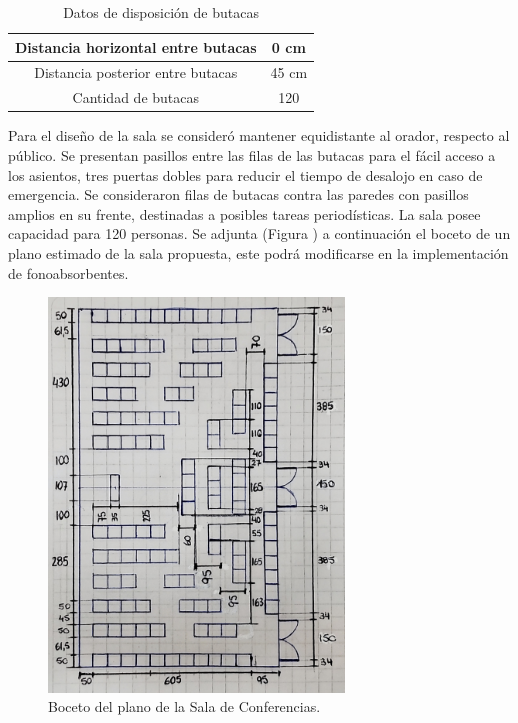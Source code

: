 \begin{table}[H]
\setlength\arrayrulewidth{1pt}
    \centering
    \begin{tabular}{|c|c|} \hline
        Distancia horizontal entre butacas & 0 cm  \\ \hline
        Distancia posterior entre butacas  & 45 cm  \\ \hline
        Cantidad de butacas & 120 \\ \hline
    \end{tabular}
    \caption{Datos de disposición de butacas}
    \label{tab:my_label}
\end{table}

\par Para el diseño de la sala se consideró mantener equidistante al orador, respecto al público. Se presentan pasillos entre las filas de las butacas para el fácil acceso a los asientos, tres puertas dobles para reducir el tiempo de desalojo en caso de emergencia. Se consideraron filas de butacas contra las paredes con pasillos amplios en su frente, destinadas a posibles tareas periodísticas. La sala posee capacidad para 120 personas. Se adjunta (Figura ) a continuación el boceto de un plano estimado de la sala propuesta, este podrá modificarse en la implementación de fonoabsorbentes. 


\begin{figure}[H]
	\centering
	\includegraphics[width=0.7\textwidth]{./img/sala_medidas.jpg}
	\caption{Boceto del plano de la Sala de Conferencias.}
	\label{fig:plano}
\end{figure}
